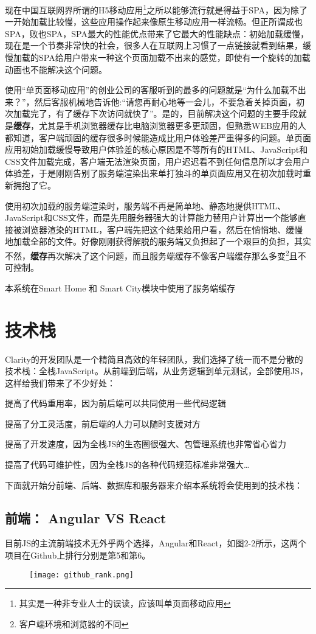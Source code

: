 现在中国互联网界所谓的H5移动应用\footnote{其实是一种非专业人士的误读，应该叫单页面移动应用}之所以能够流行就是得益于SPA，因为除了一开始加载比较慢，这些应用操作起来像原生移动应用一样流畅。但正所谓成也SPA，败也SPA，SPA最大的性能优点带来了它最大的性能缺点：初始加载缓慢，现在是一个节奏非常快的社会，很多人在互联网上习惯了一点链接就看到结果，缓慢加载的SPA给用户带来一种这个页面加载不出来的感觉，即使有一个旋转的加载动画也不能解决这个问题。

使用“单页面移动应用”的创业公司的客服听到的最多的问题就是“为什么加载不出来？”，然后客服机械地告诉他:“请您再耐心地等一会儿，不要急着关掉页面，初次加载完了，有了缓存下次访问就快了”。是的，目前解决这个问题的主要手段就是\textbf{缓存}，尤其是手机浏览器缓存比电脑浏览器更多更顽固，但熟悉WEB应用的人都知道，客户端顽固的缓存很多时候能造成比用户体验差严重得多的问题。单页面应用初始加载缓慢导致用户体验差的核心原因是不等所有的HTML、JavaScript和CSS文件加载完成，客户端无法渲染页面，用户迟迟看不到任何信息所以才会用户体验差，于是刚刚告别了服务端渲染出来单打独斗的单页面应用又在初次加载时重新拥抱了它。

使用初次加载的服务端渲染时，服务端不再是简单地、静态地提供HTML、JavaScript和CSS文件，而是先用服务器强大的计算能力替用户计算出一个能够直接被浏览器渲染的HTML，客户端先把这个结果给用户看，然后在悄悄地、缓慢地加载全部的文件。好像刚刚获得解脱的服务端又负担起了一个艰巨的负担，其实不然，\textbf{缓存}再次解决了这个问题，而且服务端缓存不像客户端缓存那么多变\footnote{客户端环境和浏览器的不同}且不可控制。

本系统在Smart Home 和 Smart City模块中使用了服务端缓存
\section{技术栈}
Clarity的开发团队是一个精简且高效的年轻团队，我们选择了统一而不是分散的技术栈：全栈JavaScript。从前端到后端，从业务逻辑到单元测试，全部使用JS，这样给我们带来了不少好处：
\begin{enumerate*}
  \item 提高了代码重用率，因为前后端可以共同使用一些代码逻辑
  \item 提高了分工灵活度，前后端的人力可以随时支援对方
  \item 提高了开发速度，因为全栈JS的生态圈很强大、包管理系统也非常省心省力
  \item 提高了代码可维护性，因为全栈JS的各种代码规范标准非常强大\ldots
\end{enumerate*}

下面就开始分前端、后端、数据库和服务器来介绍本系统将会使用到的技术栈：
\subsection{前端： Angular VS React}
目前JS的主流前端技术无外乎两个选择，Angular和React，如图2-2所示，这两个项目在Github上排行分别是第5和第6。
\begin{figure}[!htp]
 \centering
 \texttt{[image: github\_rank.png]}
\end{figure}
